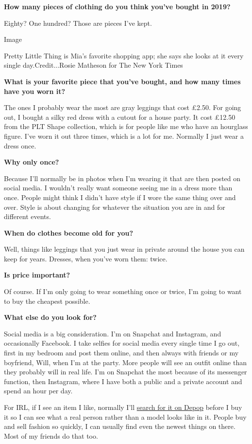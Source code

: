 \textbf{How many pieces of clothing do you think you've bought in 2019?}

Eighty? One hundred? Those are pieces I've kept.

Image

Pretty Little Thing is Mia's favorite shopping app; she says she looks
at it every single day.Credit...Rosie Matheson for The New York Times

\textbf{What is your favorite piece that you've bought, and how many
times have you worn it?}

The ones I probably wear the most are gray leggings that cost £2.50. For
going out, I bought a silky red dress with a cutout for a house party.
It cost £12.50 from the PLT Shape collection, which is for people like
me who have an hourglass figure. I've worn it out three times, which is
a lot for me. Normally I just wear a dress once.

\textbf{Why only once?}

Because I'll normally be in photos when I'm wearing it that are then
posted on social media. I wouldn't really want someone seeing me in a
dress more than once. People might think I didn't have style if I wore
the same thing over and over. Style is about changing for whatever the
situation you are in and for different events.

\textbf{When do clothes become old for you?}

Well, things like leggings that you just wear in private around the
house you can keep for years. Dresses, when you've worn them: twice.

\textbf{Is price important?}

Of course. If I'm only going to wear something once or twice, I'm going
to want to buy the cheapest possible.

\textbf{What else do you look for?}

Social media is a big consideration. I'm on Snapchat and Instagram, and
occasionally Facebook. I take selfies for social media every single time
I go out, first in my bedroom and post them online, and then always with
friends or my boyfriend, Will, when I'm at the party. More people will
see an outfit online than they probably will in real life. I'm on
Snapchat the most because of its messenger function, then Instagram,
where I have both a public and a private account and spend an hour per
day.

For IRL, if I see an item I like, normally I'll
\href{https://www.nytimes3xbfgragh.onion/2019/07/09/style/internet-girl-depop.html}{search
for it on Depop} before I buy it so I can see what a real person rather
than a model looks like in it. People buy and sell fashion so quickly, I
can usually find even the newest things on there. Most of my friends do
that too.

